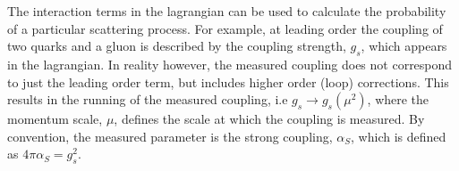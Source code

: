 The interaction terms in the lagrangian can be used to calculate the probability of a particular scattering process. For example, at leading order the coupling of two quarks and a gluon is described by the coupling strength, $g_s$, which appears in the lagrangian. In reality however, the measured coupling does not correspond to just the leading order term, but includes higher order (loop) corrections. This results in the running of the measured coupling, i.e $g_s \rightarrow g_s(\mu^2)$, where the momentum scale, $\mu$, defines the scale at which the coupling is measured. By convention, the measured parameter is the strong coupling, $\alpha_S$, 
which is defined as $4\pi \alpha_S = g_s^2$. %

